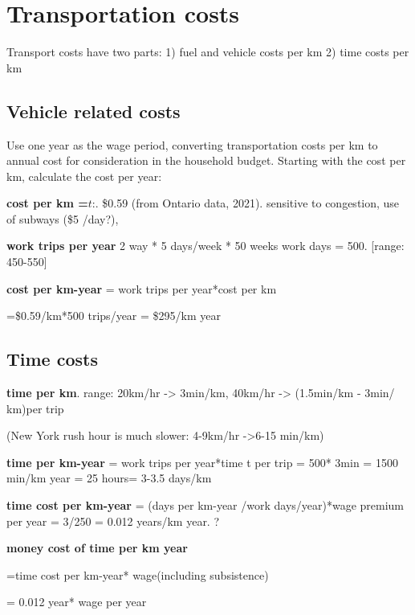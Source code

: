     


 

\section{Transportation costs}
Transport costs have two parts:
1) fuel and vehicle costs per km
2) time costs per km

\subsection{Vehicle related costs}
Use one year as the wage period, converting transportation costs per km to annual cost for consideration in the household budget. Starting with the cost per km, calculate the cost per year:

\textbf{cost per km =$\textit{t}$}:. \$0.59   (from  Ontario data, 2021). sensitive to congestion, use of subways (\$5 /day?), 

 \textbf{work trips per year} 2 way * 5 days/week * 50 weeks work days = 500. [range: 450-550]

\textbf{cost per km-year} = work trips per year*cost per km

=\$0.59/km*500 trips/year  =  \$295/km year 



\subsection{Time costs}
\textbf{time per km}. range: 20km/hr -> 3min/km, 40km/hr -> (1.5min/km - 3min/ km)per trip 

(New York rush hour is much slower:  4-9km/hr ->6-15 min/km)

\textbf{time  per km-year} = work trips per year*time t per trip = 500* 3min  = 1500 min/km year = 25 hours= 3-3.5 days/km
 
\textbf{time cost per km-year} =  (days per km-year /work days/year)*wage premium per year  = 3/250 = 0.012 years/km year. ?

\textbf{money cost of time per km year} 

=time cost per km-year* wage(including subsistence) 

= 0.012 year* wage per year


